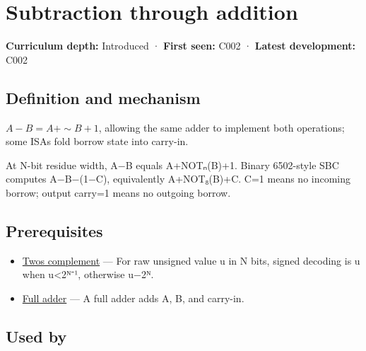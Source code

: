 \hypertarget{appendix-1c7df340573e}{}\label{referencestart:appendix-1c7df340573e}
\section{Subtraction through addition}\label{appendix-1c7df340573e-subtraction-through-addition}

\hypertarget{appendix-1c7df340573e-subtraction-through-addition}{}

\textbf{Curriculum depth:} Introduced · \textbf{First seen:} C002 · \textbf{Latest development:} C002

\begin{allmightroledefinition}

\subsection{Definition and mechanism}\label{appendix-1c7df340573e-definition-and-mechanism}

\hypertarget{appendix-1c7df340573e-definition-and-mechanism}{}

\(A-B=A+\sim B+1\), allowing the same adder to implement both operations; some ISAs fold borrow state into carry-in.

\end{allmightroledefinition}

At N-bit residue width, A−B equals A+NOTₙ(B)+1. Binary 6502-style SBC computes A−B−(1−C), equivalently A+NOT₈(B)+C. C=1 means no incoming borrow; output carry=1 means no outgoing borrow.

\subsection{Prerequisites}\label{appendix-1c7df340573e-prerequisites}

\hypertarget{appendix-1c7df340573e-prerequisites}{}

\begin{itemize}
\tightlist
\item
  \hyperref[appendix-4fbc03d20829]{Two\textquotesingle s complement} --- For raw unsigned value u in N bits, signed decoding is u when u\textless2ᴺ⁻¹, otherwise u−2ᴺ.
\item
  \hyperref[appendix-d1a5b1e520c2]{Full adder} --- A full adder adds A, B, and carry-in.
\end{itemize}

\subsection{Used by}\label{appendix-1c7df340573e-used-by}

